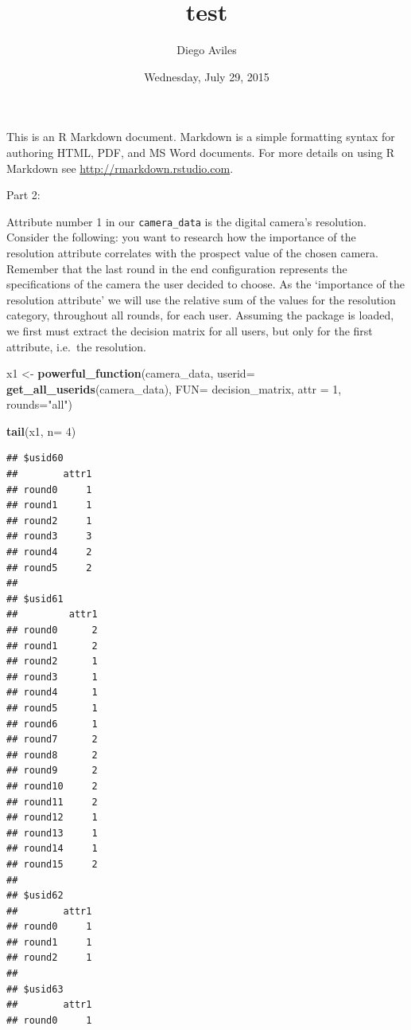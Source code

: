\documentclass[]{article}
\title{test}
\author{Diego Aviles}
\date{Wednesday, July 29, 2015}
\newenvironment{Shaded}{\begin{snugshade}}{\end{snugshade}}
\newcommand{\KeywordTok}[1]{\textcolor[rgb]{0.13,0.29,0.53}{\textbf{{#1}}}}
\newcommand{\DataTypeTok}[1]{\textcolor[rgb]{0.13,0.29,0.53}{{#1}}}
\newcommand{\DecValTok}[1]{\textcolor[rgb]{0.00,0.00,0.81}{{#1}}}
\newcommand{\StringTok}[1]{\textcolor[rgb]{0.31,0.60,0.02}{{#1}}}
\newcommand{\NormalTok}[1]{{#1}}
\begin{document}
\maketitle


This is an R Markdown document. Markdown is a simple formatting syntax
for authoring HTML, PDF, and MS Word documents. For more details on
using R Markdown see \url{http://rmarkdown.rstudio.com}.

Part 2:

Attribute number 1 in our \texttt{camera\_data} is the digital camera's
resolution. Consider the following: you want to research how the
importance of the resolution attribute correlates with the prospect
value of the chosen camera. Remember that the last round in the end
configuration represents the specifications of the camera the user
decided to choose. As the `importance of the resolution attribute' we
will use the relative sum of the values for the resolution category,
throughout all rounds, for each user. Assuming the package is loaded, we
first must extract the decision matrix for all users, but only for the
first attribute, i.e.~the resolution.

\begin{Shaded}
\begin{Highlighting}[]
\NormalTok{x1 <-}\StringTok{ }\KeywordTok{powerful_function}\NormalTok{(camera_data, }\DataTypeTok{userid=} \KeywordTok{get_all_userids}\NormalTok{(camera_data),}
                        \DataTypeTok{FUN=} \NormalTok{decision_matrix, }
                        \DataTypeTok{attr =} \DecValTok{1}\NormalTok{, }
                        \DataTypeTok{rounds=}\StringTok{"all"}\NormalTok{)}
\end{Highlighting}
\end{Shaded}

\begin{Shaded}
\begin{Highlighting}[]
\KeywordTok{tail}\NormalTok{(x1, }\DataTypeTok{n=} \DecValTok{4}\NormalTok{)}
\end{Highlighting}
\end{Shaded}

\begin{verbatim}
## $usid60
##        attr1
## round0     1
## round1     1
## round2     1
## round3     3
## round4     2
## round5     2
## 
## $usid61
##         attr1
## round0      2
## round1      2
## round2      1
## round3      1
## round4      1
## round5      1
## round6      1
## round7      2
## round8      2
## round9      2
## round10     2
## round11     2
## round12     1
## round13     1
## round14     1
## round15     2
## 
## $usid62
##        attr1
## round0     1
## round1     1
## round2     1
## 
## $usid63
##        attr1
## round0     1
\end{verbatim}
\end{document}
